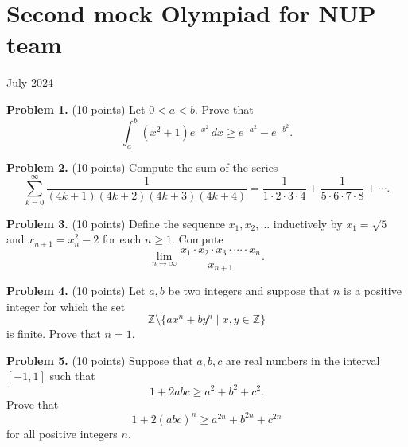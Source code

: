 \documentclass{article}
\begin{document}
\pagestyle{plain}

\section*{Second mock Olympiad for NUP team}

\begin{center}
July 2024
\end{center}

\textbf{Problem 1.} (10 points)
Let \(0 < a < b\). Prove that
\[
\int_{a}^{b} (x^2 + 1) e^{-x^2} \, dx \geq e^{-a^2} - e^{-b^2}.
\]

\textbf{Problem 2.} (10 points)
Compute the sum of the series
\[
\sum_{k=0}^{\infty} \frac{1}{(4k+1)(4k+2)(4k+3)(4k+4)} = \frac{1}{1 \cdot 2 \cdot 3 \cdot 4} + \frac{1}{5 \cdot 6 \cdot 7 \cdot 8} + \cdots.
\]

\textbf{Problem 3.} (10 points)
Define the sequence \( x_1, x_2, \ldots \) inductively by \( x_1 = \sqrt{5} \) and \( x_{n+1} = x_n^2 - 2 \) for each \( n \geq 1 \). Compute
\[
\lim_{n \to \infty} \frac{x_1 \cdot x_2 \cdot x_3 \cdot \cdots \cdot x_n}{x_{n+1}}.
\]

\textbf{Problem 4.} (10 points)
Let \( a, b \) be two integers and suppose that \( n \) is a positive integer for which the set
\[
\mathbb{Z} \setminus \{ ax^n + by^n \mid x, y \in \mathbb{Z} \}
\]
is finite. Prove that \( n = 1 \).

\textbf{Problem 5.} (10 points) Suppose that \( a, b, c \) are real numbers in the interval \([-1, 1]\) such that
\[
1 + 2abc \geq a^2 + b^2 + c^2.
\]
Prove that
\[
1 + 2(abc)^n \geq a^{2n} + b^{2n} + c^{2n}
\]
for all positive integers \( n \).
\end{document}
